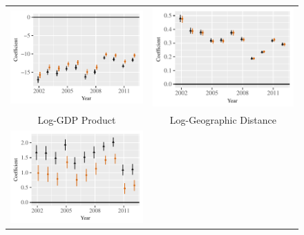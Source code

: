 \documentclass{article}
\begin{document}
\begin{figure}[htp]
\begin{tabular}{c@{\hskip -.4cm}c}
\includegraphics[height=.22\textheight, clip=true, trim=0cm .5cm 0cm .1cm]{draft_figures/rl_plots/Nonzero.pdf} &
\includegraphics[height=.22\textheight, clip=true, trim=.5cm .5cm 0cm .1cm]{draft_figures/rl_plots/LDV.pdf}   \\
Log-GDP Product &
Log-Geographic Distance\\
\includegraphics[height=.22\textheight, clip=true, trim=0cm .5cm 0cm .1cm]{draft_figures/rl_plots/Mass.pdf}    &

\end{tabular}
\end{figure}
\end{document}
